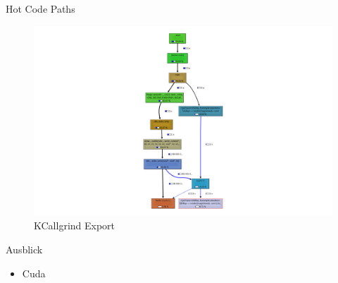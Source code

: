 	\begin{frame}{Hot Code Paths}
		\begin{figure}[ht]
        	\begin{minipage}[b]{0.7\linewidth}
            \centering
            \includegraphics[width=\textwidth]{images/callgrind2.png}
            \caption{KCallgrind Export}
            \label{fig:a}
        	\end{minipage}
	\end{figure}
	\end{frame}

	\begin{frame}{Ausblick}
		\begin{itemize}
			\item Cuda
		\end{itemize}
	\end{frame}

